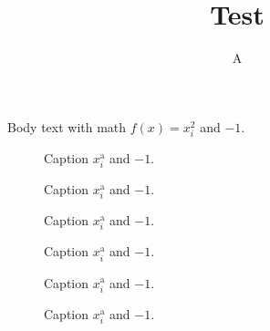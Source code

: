 \documentclass[10pt,aspectratio=169,notheorems]{beamer}
\title{Test}
\author{A}
\begin{document}
\maketitle

\begin{frame}
  Body text with math $f(x) = x_{i}^{2}$ and $-1$.
\end{frame}

\begin{frame}
  \begin{figure}
    \centering
    \caption{Caption $x_{i}^{\text{a}}$ and $-1$.}
  \end{figure}
\end{frame}

\begin{frame}
  \begin{figure}
    \centering
    \caption{Caption $x_{i}^{\text{a}}$ and $-1$.}
  \end{figure}
\end{frame}

\begin{frame}
  \begin{figure}
    \centering
    \caption{Caption $x_{i}^{\text{a}}$ and $-1$.}
  \end{figure}
\end{frame}

\begin{frame}
  \begin{figure}
    \centering
    \caption{Caption $x_{i}^{\text{a}}$ and $-1$.}
  \end{figure}
\end{frame}

\begin{frame}
  \begin{figure}
    \centering
    \caption{Caption $x_{i}^{\text{a}}$ and $-1$.}
  \end{figure}
\end{frame}

\begin{frame}
  \begin{figure}
    \centering
    \caption{Caption $x_{i}^{\text{a}}$ and $-1$.}
  \end{figure}
\end{frame}
\end{document}
